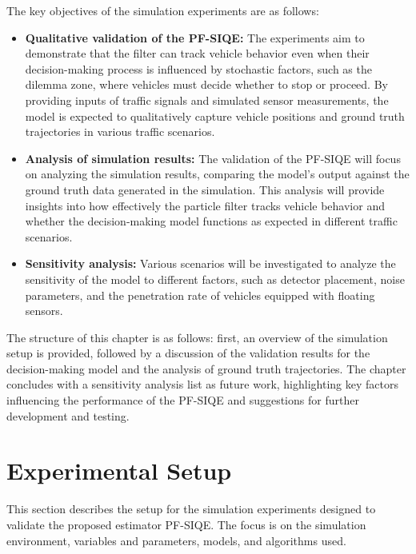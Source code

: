 The key objectives of the simulation experiments are as follows:
\begin{itemize}
    \item \textbf{Qualitative validation of the PF-SIQE:} The experiments aim to demonstrate that the filter can track vehicle behavior even when their decision-making process is influenced by stochastic factors, such as the dilemma zone, where vehicles must decide whether to stop or proceed. By providing inputs of traffic signals and simulated sensor measurements, the model is expected to qualitatively capture vehicle positions and ground truth trajectories in various traffic scenarios.
    \item \textbf{Analysis of simulation results:} The validation of the PF-SIQE will focus on analyzing the simulation results, comparing the model's output against the ground truth data generated in the simulation. This analysis will provide insights into how effectively the particle filter tracks vehicle behavior and whether the decision-making model functions as expected in different traffic scenarios.
    \item \textbf{Sensitivity analysis:} Various scenarios will be investigated to analyze the sensitivity of the model to different factors, such as detector placement, noise parameters, and the penetration rate of vehicles equipped with floating sensors.
\end{itemize}

The structure of this chapter is as follows: first, an overview of the simulation setup is provided, followed by a discussion of the validation results for the decision-making model and the analysis of ground truth trajectories. The chapter concludes with a sensitivity analysis list as future work, highlighting key factors influencing the performance of the PF-SIQE and suggestions for further development and testing.











\section{Experimental Setup}
This section describes the setup for the simulation experiments designed to validate the proposed estimator PF-SIQE. The focus is on the simulation environment, variables and parameters, models, and algorithms used.

